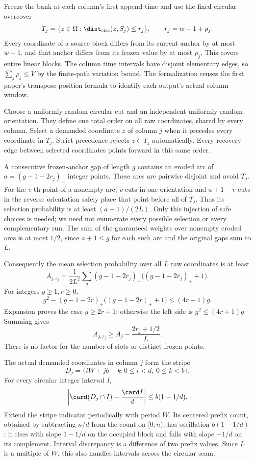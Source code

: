 \begin{outline}
Freeze the bank at each column's first append time and use the fixed
circular overcover
\[
 T_j=\{z\in\Omega:\dist_{\rm circ}(z,S_j)\le r_j\},
 \qquad r_j=w-1+\rho_j.
\]
Every coordinate of a source block differs from its current anchor by
at most $w-1$, and that anchor differs from its frozen value by at most
$\rho_j$. This covers entire linear blocks. The column time intervals
have disjoint elementary edges, so $\sum_j\rho_j\le V$ by the
finite-path variation bound. The formalization reuses the first paper's
transpose-position formula to identify each output's actual column window.

Choose a uniformly random circular cut and an independent uniformly
random orientation. They define one total order on all raw coordinates,
shared by every column. Select a demanded coordinate $z$ of column $j$
when it precedes every coordinate in $T_j$. Strict precedence rejects
$z\in T_j$ automatically. Every recovery edge between selected
coordinates points forward in this same order.

A consecutive frozen-anchor gap of length $g$ contains an eroded arc
of $a=(g-1-2r_j)_+$ integer points. These arcs are pairwise disjoint
and avoid $T_j$. For the $v$-th point of a nonempty arc, $v$ cuts in
one orientation and $a+1-v$ cuts in the reverse orientation safely
place that point before all of $T_j$. Thus its selection probability
is at least $(a+1)/(2L)$. Only this injection of safe choices is needed;
we need not enumerate every possible selection or every complementary run.
The sum of the guaranteed weights over nonempty eroded arcs is at most
$1/2$, since $a+1\le g$ for each such arc and the original gaps sum to $L$.

Consequently the mean selection probability over all $L$ raw coordinates is at least
\[
 A_{j,r_j}=\frac1{2L^2}
       \sum_{g}(g-1-2r_j)_+\bigl((g-1-2r_j)_++1\bigr).
\]
For integers $g\ge1,r\ge0$,
\[
 g^2-(g-1-2r)_+\bigl((g-1-2r)_++1\bigr)\le(4r+1)g.
\]
Expansion proves the case $g\ge2r+1$; otherwise the left side is
$g^2\le(4r+1)g$. Summing gives
\begin{equation}\label{eq:thickening-area}
 A_{j,r_j}\ge A_j-\frac{2r_j+1/2}{L}.
\end{equation}
There is no factor for the number of slots or distinct frozen points.

The actual demanded coordinates in column $j$ form the stripe
\[
 D_j=\{iW+jb+k:0\le i<d,\ 0\le k<b\}.
\]
For every circular integer interval $I$,
\begin{equation}\label{eq:stripe-discrepancy}
 \left|\card(D_j\cap I)-\frac{\card I}{d}\right|
       \le b(1-1/d).
\end{equation}
Extend the stripe indicator periodically with period $W$. Its centered
prefix count, obtained by subtracting $n/d$ from the count on $[0,n)$,
has oscillation $b(1-1/d)$: it rises with slope $1-1/d$ on the occupied
block and falls with slope $-1/d$ on its complement. Interval discrepancy
is a difference of two prefix values. Since $L$ is a multiple of $W$,
this also handles intervals across the circular seam.


\end{outline}

